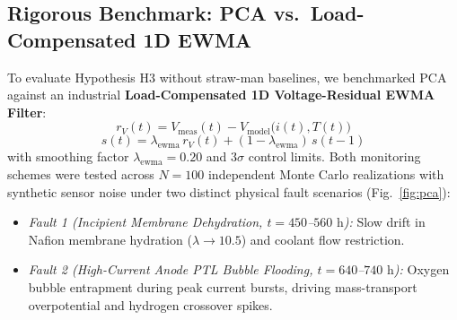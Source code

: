 \documentclass[conference]{IEEEtran}
\begin{document}
\subsection{Rigorous Benchmark: PCA vs.\ Load-Compensated 1D EWMA}
To evaluate Hypothesis H3 without straw-man baselines, we benchmarked PCA against an industrial \textbf{Load-Compensated 1D Voltage-Residual EWMA Filter}:
\begin{equation}
r_V(t) = V_{\text{meas}}(t) - V_{\text{model}}\big(i(t), T(t)\big)
\end{equation}
\begin{equation}
s(t) = \lambda_{\text{ewma}}\, r_V(t) + (1 - \lambda_{\text{ewma}})\, s(t-1)
\end{equation}
with smoothing factor $\lambda_{\text{ewma}} = 0.20$ and $3\sigma$ control limits. Both monitoring schemes were tested across $N = 100$ independent Monte Carlo realizations with synthetic sensor noise under two distinct physical fault scenarios (Fig.~\ref{fig:pca}):
\begin{itemize}
    \item \textit{Fault 1 (Incipient Membrane Dehydration, $t = 450$--$560\text{ h}$):} Slow drift in Nafion membrane hydration ($\lambda \to 10.5$) and coolant flow restriction.
    \item \textit{Fault 2 (High-Current Anode PTL Bubble Flooding, $t = 640$--$740\text{ h}$):} Oxygen bubble entrapment during peak current bursts, driving mass-transport overpotential and hydrogen crossover spikes.
\end{itemize}
\end{document}
